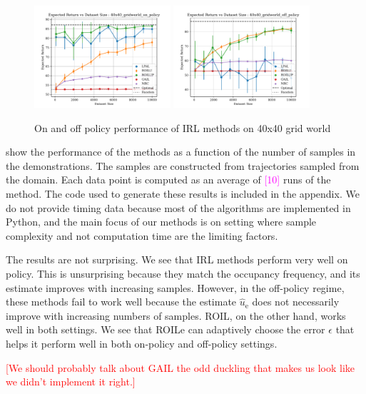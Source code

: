 \documentclass[10pt]{article}
\theoremstyle{plain}
\theoremstyle{remark}
\newcommand{\mm}[1]{\textcolor{magenta}{[#1]}}
\newcommand{\gersi}[1]{\textcolor{red}{[#1]}}
\begin{document}
\begin{figure}
	\centering
	\includegraphics[width=0.45\textwidth]{../src/plots/returns/40x40_gridworld_on_policy_returns.pdf}
	\includegraphics[width=0.45\textwidth]{../src/plots/returns/40x40_gridworld_off_policy_returns.pdf}
	\caption{On and off policy performance of IRL methods on 40x40 grid world}
	\label{fig:grid-40}
\end{figure}


 show the performance of the methods as a function of the number of samples in the demonstrations. The samples are constructed from trajectories sampled from the domain. Each data point is computed as an average of \mm{10} runs of the method. The code used to generate these results is included in the appendix. We do not provide timing data because most of the algorithms are implemented in Python, and the main focus of our methods is on setting where sample complexity and not computation time are the limiting factors. 


The results are not surprising. We see that IRL methods perform very well on policy. This is unsurprising because they match the occupancy frequency, and its estimate improves with increasing samples. However, in the off-policy regime, these methods fail to work well because the estimate $\hat{u}_{\mathrm{e}}$ does not necessarily improve with increasing numbers of samples. ROIL, on the other hand, works well in both settings. We see that ROILe can adaptively choose the error $\epsilon$ that helps it perform well in both on-policy and off-policy settings. 

\gersi{We should probably talk about GAIL the odd duckling that makes us look like we didn't implement it right.}
\end{document}

